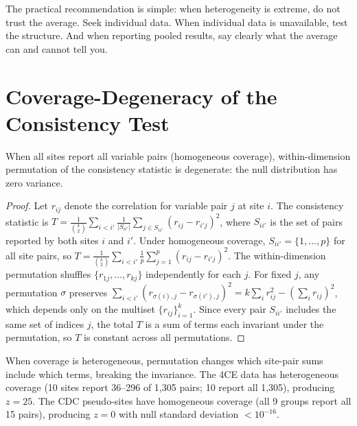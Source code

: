 \documentclass{article}
\begin{document}
The practical recommendation is simple: when heterogeneity is extreme, do not
trust the average.  Seek individual data.  When individual data is
unavailable, test the structure.  And when reporting pooled results, say
clearly what the average can and cannot tell you.


\appendix

\section{Coverage-Degeneracy of the Consistency Test}
\label{app:degeneracy}

\begin{proposition}
When all sites report all variable pairs (homogeneous coverage), within-dimension permutation of the consistency statistic is degenerate: the null distribution has zero variance.
\end{proposition}

\begin{proof}
Let $r_{ij}$ denote the correlation for variable pair $j$ at site $i$.  The consistency statistic is $T = \frac{1}{\binom{k}{2}} \sum_{i < i'} \frac{1}{|S_{ii'}|} \sum_{j \in S_{ii'}} (r_{ij} - r_{i'j})^2$, where $S_{ii'}$ is the set of pairs reported by both sites $i$ and $i'$.
Under homogeneous coverage, $S_{ii'} = \{1, \ldots, p\}$ for all site pairs, so $T = \frac{1}{\binom{k}{2}} \sum_{i < i'} \frac{1}{p} \sum_{j=1}^{p} (r_{ij} - r_{i'j})^2$.
The within-dimension permutation shuffles $\{r_{1j}, \ldots, r_{kj}\}$ independently for each $j$.
For fixed $j$, any permutation $\sigma$ preserves $\sum_{i<i'} (r_{\sigma(i),j} - r_{\sigma(i'),j})^2 = k \sum_i r_{ij}^2 - (\sum_i r_{ij})^2$, which depends only on the multiset $\{r_{ij}\}_{i=1}^k$.
Since every pair $S_{ii'}$ includes the same set of indices $j$, the total $T$ is a sum of terms each invariant under the permutation, so $T$ is constant across all permutations.
\end{proof}

When coverage is heterogeneous, permutation changes which site-pair sums include which terms, breaking the invariance.  The 4CE data has heterogeneous coverage (10 sites report 36--296 of 1,305 pairs; 10 report all 1,305), producing $z = 25$.  The CDC pseudo-sites have homogeneous coverage (all 9 groups report all 15 pairs), producing $z = 0$ with null standard deviation $< 10^{-16}$.



\end{document}
